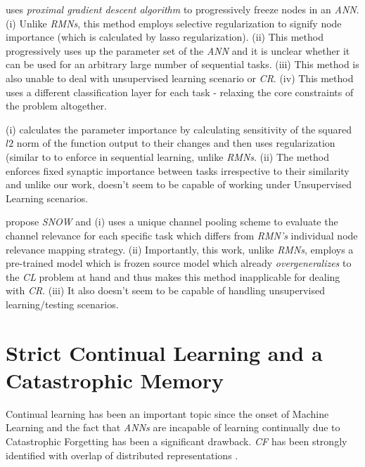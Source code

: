 \documentclass{article}
\begin{document}
\cite{jung2020continual} uses \textit{proximal gradient descent algorithm} to progressively freeze nodes in an \textit{ANN}. 
(i) Unlike \textit{RMNs}, this method employs selective regularization to signify node importance (which is calculated by lasso regularization). 
(ii) This method progressively uses up the parameter set of the \textit{ANN} and it is unclear whether it can be used for an arbitrary large number of sequential tasks. 
(iii) This method is also unable to deal with unsupervised learning scenario or \textit{CR}. (iv) This method uses a different classification layer for each task - relaxing the core constraints of the problem altogether.

\cite{ferrari_memory_2018} (i) calculates the parameter importance by calculating sensitivity of the squared $l2$ norm of the function output to their changes and then uses regularization (similar to \cite{kirkpatrick2017overcoming} to enforce in sequential learning, unlike \textit{RMNs}. 
    (ii) The method enforces fixed synaptic importance between tasks irrespective to their similarity and unlike our work, doesn't seem to be capable of working under Unsupervised Learning scenarios.
    
\cite{yoo_snow_2020} propose \textit{SNOW} and (i) uses a unique channel pooling scheme to evaluate the channel relevance for each specific task which differs from \textit{RMN's} individual node relevance mapping strategy. 
    (ii) Importantly, this work, unlike \textit{RMNs}, employs a pre-trained model which is frozen source model which already \textit{overgeneralizes} to the \textit{CL} problem at hand and thus makes this method inapplicable for dealing with \textit{CR}. (iii) It also doesn't seem to be capable of handling unsupervised learning/testing scenarios.

\label{related}


\section{Strict Continual Learning and a Catastrophic Memory}\label{disc}
Continual learning has been an important topic since the onset of Machine Learning and the fact that \textit{ANNs} are incapable of learning continually due to Catastrophic Forgetting has been a significant drawback. 
\textit{CF} has been strongly identified with overlap of distributed representations \cite{French1991}.
\end{document}
